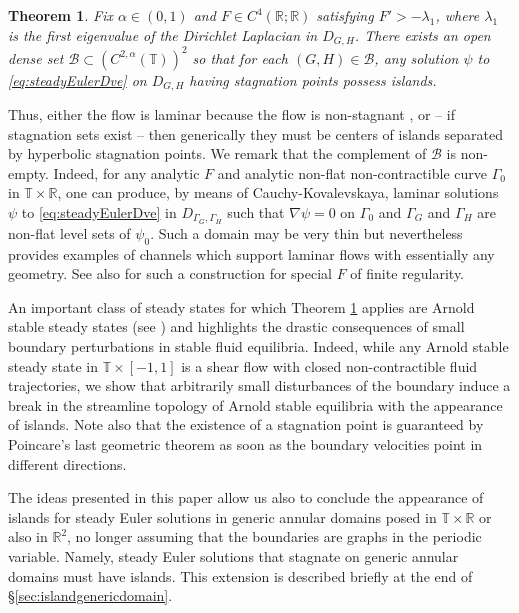 \documentclass[11pt,reqno]{amsproc}
\newcommand{\R}{\mathbb{R}}
\newcommand{\B}{\mathcal{B}}
\numberwithin{equation}{section}
\newtheorem{theorem}{Theorem}
\numberwithin{theorem}{section}
\numberwithin{prop}{section}
\numberwithin{cor}{section}
\numberwithin{lemma}{section}
\theoremstyle{remark}
\theoremstyle{definition}
\begin{document}
\begin{theorem}\label{thm:genericityisland}
Fix $\alpha\in (0,1)$ and $F\in C^4(\mathbb{R};\mathbb{R})$ satisfying  $F'>-\lambda_1$, where $\lambda_1$ is the first eigenvalue of the Dirichlet Laplacian in $D_{G,H}$. There exists an open dense set $\B\subset (C^{2,\alpha}(\mathbb{T}))^2$ so that for each $(G,H)\in \B$,  any solution $\psi$ to \eqref{eq:steadyEulerDve}   on $D_{G,H}$  having stagnation points possess islands. 
\end{theorem}
Thus, either the flow is laminar because the flow is non-stagnant \cite{CDG21}, or -- if stagnation sets exist -- then generically they must be centers of islands separated by hyperbolic stagnation points. We remark that the complement of $\mathcal{B}$ is non-empty. Indeed, for any analytic $F$ and analytic non-flat non-contractible curve $\Gamma_0$ in $\mathbb{T}\times\R$, one can produce, by means of Cauchy-Kovalevskaya, laminar solutions $\psi$ to \eqref{eq:steadyEulerDve} in $D_{\Gamma_G,\Gamma_H}$ such that $\nabla\psi=0$ on $\Gamma_0$ and $\Gamma_G$ and $\Gamma_H$ are non-flat level sets of $\psi_0$. Such a domain may be very thin but nevertheless provides examples of channels which support laminar flows with essentially any geometry. See also \cite[Theorem 4.12]{elgindi2024classification} for such a construction for special $F$ of finite regularity.

An important class of steady states for which Theorem \ref{thm:genericityisland} applies are Arnold stable steady states (see \cite{arnold2009topological, arnold1966geometrie}) and highlights the drastic consequences of small boundary perturbations in stable fluid equilibria. Indeed, while any Arnold stable steady state in $\mathbb{T}\times[-1,1]$ is a shear flow with closed non-contractible fluid trajectories, we show that arbitrarily small disturbances of the boundary induce a break in the streamline topology of Arnold stable equilibria with the appearance of islands.  Note  also that the existence of a stagnation point is guaranteed by Poincare's last geometric theorem as soon as the boundary velocities point in different directions.


The ideas presented in this paper allow us also to conclude the appearance of islands for steady Euler solutions  in generic annular domains posed in $\mathbb{T}\times \R$ or also in $\mathbb{R}^2$, no longer assuming that the boundaries are graphs in the periodic variable. Namely,  steady Euler solutions that stagnate on generic annular domains  must have islands. This extension is described briefly  at the end of \S \ref{sec:islandgenericdomain}.
\end{document}
